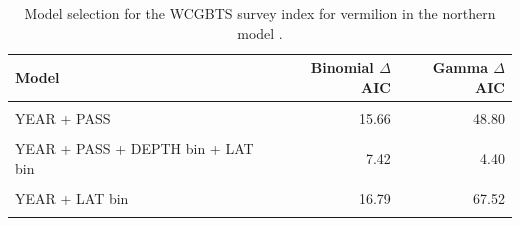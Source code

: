 \documentclass[
  english,
  a4paper,
]{article}
\begin{document}
\FloatBarrier

\begin{table}

\caption{\label{tab:tab-model-select-wcgbts}Model selection for the WCGBTS survey index for vermilion in the northern model .}
\centering
\begin{tabular}[t]{lrr}
\toprule
Model & Binomial $\Delta$AIC & Gamma $\Delta$AIC\\
\midrule
\cellcolor{gray!6}{1} & \cellcolor{gray!6}{0.00} & \cellcolor{gray!6}{67.52}\\
YEAR + PASS & 15.66 & 48.80\\
\cellcolor{gray!6}{YEAR + PASS + DEPTH bin} & \cellcolor{gray!6}{15.59} & \cellcolor{gray!6}{0.00}\\
YEAR + PASS + DEPTH bin + LAT bin & 7.42 & 4.40\\
\cellcolor{gray!6}{YEAR + DEPTH bin + LAT bin} & \cellcolor{gray!6}{12.04} & \cellcolor{gray!6}{10.96}\\
\addlinespace
YEAR + LAT bin & 16.79 & 67.52\\
\cellcolor{gray!6}{YEAR + PASS + LAT bin} & \cellcolor{gray!6}{12.89} & \cellcolor{gray!6}{53.13}\\
\bottomrule
\end{tabular}
\end{table}

\FloatBarrier
\end{document}
